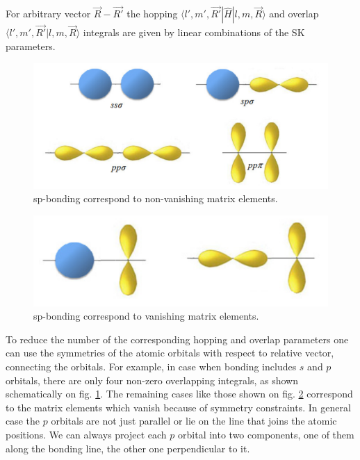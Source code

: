 For arbitrary vector $\vec{R} - \vec{R'} $ the hopping $\langle l', m', \vec{R'} | \hat{H} | l,m,\vec{R} \rangle$ and overlap $\langle l', m', \vec{R'} | l,m,\vec{R} \rangle$ integrals are given by linear combinations of the SK parameters. 

\begin{figure}[h]
  \includegraphics[width=\linewidth]{img/sp_bonding}
  \caption[caption]{sp-bonding correspond to non-vanishing matrix elements. \footnotemark\label{fig:sp} }
\end{figure}
\begin{figure}[h]  
  \includegraphics[width=\linewidth]{img/sp_vanishing}
  \caption[caption]{sp-bonding correspond to vanishing matrix elements.\footnotemark \label{fig:sp_vanishing}}
\end{figure}

To reduce the number of the corresponding hopping and overlap parameters one can use the symmetries of the atomic orbitals with respect to relative vector, connecting the orbitals. For example, in case when bonding includes $s$ and $p$ orbitals, there are only four non-zero overlapping integrals, as shown schematically on fig. \ref{fig:sp}. The remaining cases like those shown on fig. \ref{fig:sp_vanishing} correspond to the matrix elements which vanish because of symmetry constraints. In general case the $p$ orbitals are not just parallel or lie on the line that joins the atomic positions. We can always project each $p$ orbital into two components, one of them along the bonding line, the other one perpendicular to it. 

